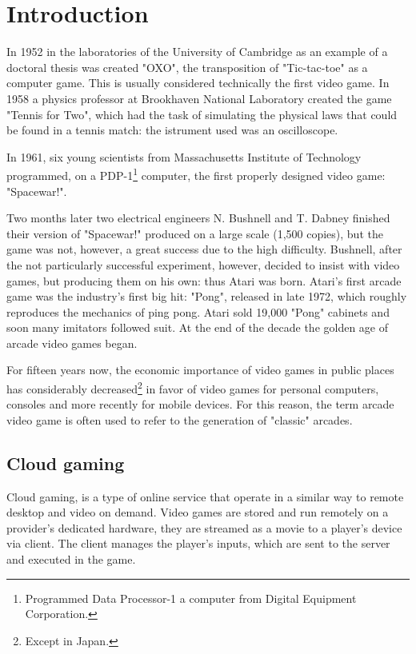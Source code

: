 \chapter{Introduction}
\label{cap:introduction}
In 1952 in the laboratories of the University of Cambridge as an example of a doctoral thesis was created "OXO", the transposition of "Tic-tac-toe" as a computer game. This is usually considered technically the first video game. In 1958 a physics professor at Brookhaven National Laboratory created the game "Tennis for Two", which had the task of simulating the physical laws that could be found in a tennis match: the istrument used was an oscilloscope.

In 1961, six young scientists from Massachusetts Institute of Technology programmed, on a PDP-1\footnote{Programmed Data Processor-1 a computer from Digital Equipment Corporation.} computer, the first properly designed video game: "Spacewar!".

Two months later two electrical engineers N. Bushnell and T. Dabney finished their version of "Spacewar!" produced on a large scale (1,500 copies), but the game was not, however, a great success due to the high difficulty. Bushnell, after the not particularly successful experiment, however, decided to insist with video games, but producing them on his own: thus Atari was born. Atari's first arcade game was the industry's first big hit: "Pong", released in late 1972, which roughly reproduces the mechanics of ping pong. Atari sold 19,000 "Pong" cabinets and soon many imitators followed suit. At the end of the decade the golden age of arcade video games began.

For fifteen years now, the economic importance of video games in public places has considerably decreased\footnote{Except in Japan.} in favor of video games for personal computers, consoles and more recently for mobile devices. For this reason, the term arcade video game is often used to refer to the generation of "classic" arcades\cite{High_Score}.

\section{Cloud gaming}
Cloud gaming, is a type of online service that operate in a similar way to remote desktop and video on demand. Video games are stored and run remotely on a provider's dedicated hardware, they are streamed as a movie to a player's device via client. The client manages the player's inputs, which are sent to the server and executed in the game.

